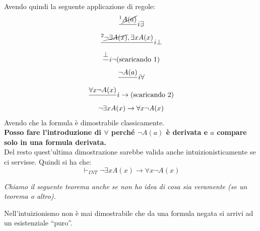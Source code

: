 \documentclass[a4paper,12pt, oneside]{book}
\begin{document}
\begin{esempio}
\begin{enumerate}
  \end{enumerate}
  Avendo quindi la seguente applicazione di regole:
  \begin{gather*}
    \frac{^1\cancel{A(a)}}{}i\exists\\
    \frac{^2\cancel{\neg \exists A(x)},\exists x A(x)}{}i\bot\\
    \frac{\bot}{}i\neg\mbox{(scaricando 1)}\\
    \frac{\neg A(a)}{}i\forall\\
    \frac{\forall x\neg A(x)}{}i\to\mbox{(scaricando 2)}\\
    \neg\exists x A(x)\to \forall x \neg A(x)
  \end{gather*}
  Avendo che la formula è dimostrabile classicamente.\\
  \textbf{Posso fare l'introduzione di $\forall$ perché $\neg A(a)$ è
    derivata e $a$ compare solo in una formula derivata.}\\
  Del resto quest'ultima  dimostrazione
  sarebbe valida anche intuizionisticamente se ci servisse. Quindi si ha che:
  \[\vdash_{INT}\neg\exists x A(x)\to \forall x \neg A(x)\] 
\end{esempio}
\textit{Chiamo il seguente teorema anche se non ho idea di cosa sia
  veramente (se un teorema o altro).}\\  
\begin{teorema}
  Nell'intuizionismo non è mai dimostrabile che da una formula negata si arrivi
  ad un esistenziale ``puro''. 
\end{teorema}
\end{document}
